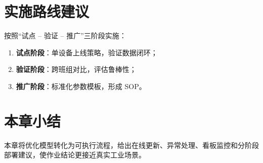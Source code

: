 \section{实施路线建议}
按照“试点 -- 验证 -- 推广”三阶段实施：
\begin{enumerate}
  \item \textbf{试点阶段}：单设备上线策略，验证数据闭环；
  \item \textbf{验证阶段}：跨班组对比，评估鲁棒性；
  \item \textbf{推广阶段}：标准化参数模板，形成 SOP。
\end{enumerate}

\section{本章小结}
本章将优化模型转化为可执行流程，给出在线更新、异常处理、看板监控和分阶段部署建议，使作业结论更接近真实工业场景。
